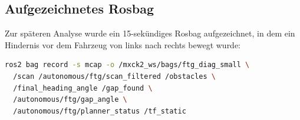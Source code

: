 
\subsection{Aufgezeichnetes Rosbag}

Zur späteren Analyse wurde ein 15-sekündiges Rosbag aufgezeichnet,
in dem ein Hindernis vor dem Fahrzeug von links nach rechts bewegt wurde:

\begin{lstlisting}[language=bash, caption={Rosbag-Aufnahmebefehl}]
ros2 bag record -s mcap -o /mxck2_ws/bags/ftg_diag_small \
  /scan /autonomous/ftg/scan_filtered /obstacles \
  /final_heading_angle /gap_found \
  /autonomous/ftg/gap_angle \
  /autonomous/ftg/planner_status /tf_static
\end{lstlisting}


